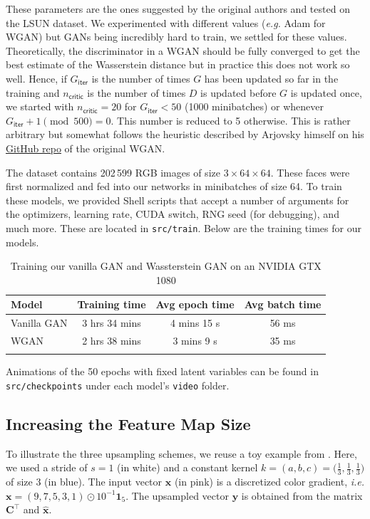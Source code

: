 \documentclass[table]{article}
\def\*#1{\mathbf{#1}}
\newcommand{\code}[1]{{\color{Blue}\small\texttt{#1}}}
\begin{document}
These parameters are the ones suggested by the original authors and tested on the LSUN dataset. We experimented with different values (\textit{e.g.} Adam for WGAN) but GANs being incredibly hard to train, we settled for these values. Theoretically, the discriminator in a WGAN should be fully converged to get the best estimate of the Wasserstein distance but in practice this does not work so well. Hence, if $G_\textsf{iter}$ is the number of times $G$ has been updated so far in the training and $n_\textsf{critic}$ is the number of times $D$ is updated before $G$ is updated once, we started with $n_\textsf{critic} = 20$ for $G_\textsf{iter} < 50$ (1000 minibatches) or whenever $G_\textsf{iter}+1 \pmod{500} = 0$. This number is reduced to 5 otherwise. This is rather arbitrary but somewhat follows the heuristic described by Arjovsky himself on his \href{https://github.com/martinarjovsky/wassersteingan}{GitHub repo} of the original WGAN.

The dataset contains 202\,599 RGB images of size $3 \times 64 \times 64$. These faces were first normalized and fed into our networks in minibatches of size 64. To train these models, we provided Shell scripts that accept a number of arguments for the optimizers, learning rate, CUDA switch, RNG seed (for debugging), and much more. These are located in \code{src/train}. Below are the training times for our models.

\begin{table}[ht]
\centering
\begin{tabular}{l c c c}
\Xhline{2\arrayrulewidth}
Model & Training time & Avg epoch time & Avg batch time \\
\hline
Vanilla GAN & 3 hrs 34 mins & 4 mins 15 s & 56 ms  \\
WGAN & 2 hrs 38 mins & 3 mins 9 s & 35 ms \\
\Xhline{2\arrayrulewidth}
\end{tabular}
\caption{Training our vanilla GAN and Wassterstein GAN on an NVIDIA GTX 1080}
\end{table}

Animations of the 50 epochs with fixed latent variables can be found in \code{src/checkpoints} under each model's \code{video} folder.

\subsection{Increasing the Feature Map Size}

To illustrate the three upsampling schemes, we reuse a toy example from \cite{odena2016deconvolution}. Here, we used a stride of $s=1$ (in white) and a constant kernel $k=(a,b,c) = \big(\frac{1}{3}, \frac{1}{3},\frac{1}{3}\big)$ of size 3 (in blue). The input vector $\*x$ (in pink) is a discretized color gradient, \textit{i.e.} $\*x = (9,7,5,3,1) \odot 10^{-1} \*1_5$. The upsampled vector $\*y$ is obtained from the matrix $\*C^\top$ and $\*{\hat x}$.
\end{document}

